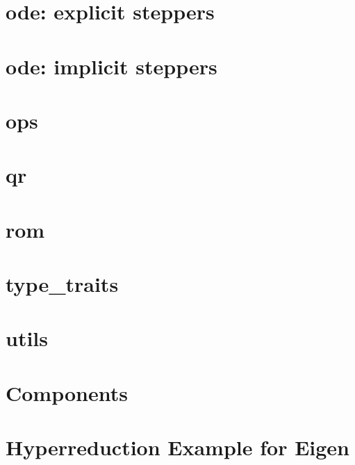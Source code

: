 \let\mypdfximage\pdfximage\def\pdfximage{\immediate\mypdfximage}\documentclass[twoside]{book}
\newcommand{\+}{\discretionary{\mbox{\scriptsize$\hookleftarrow$}}{}{}}
\begin{document}
\chapter{ode\+: explicit steppers}
\label{md_pages_components_ode_steppers_explicit}

\chapter{ode\+: implicit steppers}
\label{md_pages_components_ode_steppers_implicit}

\chapter{ops}
\label{md_pages_components_ops}

\chapter{qr}
\label{md_pages_components_qr}

\chapter{rom}
\label{md_pages_components_rom}

\chapter{type\+\_\+traits}
\label{md_pages_components_type_traits}

\chapter{utils}
\label{md_pages_components_utils}

\chapter{Components}
\label{md_pages_components}

\chapter{Hyperreduction Example for Eigen}
\label{md_pages_hyperreduction_hyperred_eigen_example}

\end{document}
